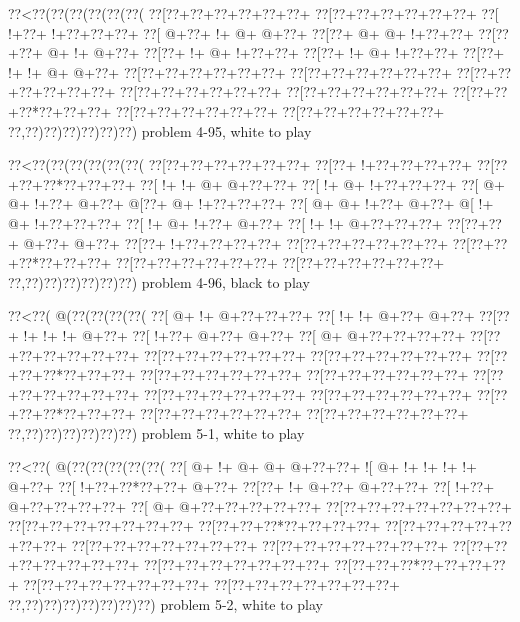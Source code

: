 \vbox{\vbox{\goo
\0??<\0??(\0??(\0??(\0??(\0??(\0??(
\0??[\0??+\0??+\0??+\0??+\0??+\0??+
\0??[\0??+\0??+\0??+\0??+\0??+\0??+
\0??[\- !+\0??+\- !+\0??+\0??+\0??+
\0??[\- @+\0??+\- !+\- @+\- @+\0??+
\0??[\0??+\- @+\- @+\- !+\0??+\0??+
\0??[\0??+\0??+\- @+\- !+\- @+\0??+
\0??[\0??+\- !+\- @+\- !+\0??+\0??+
\0??[\0??+\- !+\- @+\- !+\0??+\0??+
\0??[\0??+\- !+\- !+\- @+\- @+\0??+
\0??[\0??+\0??+\0??+\0??+\0??+\0??+
\0??[\0??+\0??+\0??+\0??+\0??+\0??+
\0??[\0??+\0??+\0??+\0??+\0??+\0??+
\0??[\0??+\0??+\0??+\0??+\0??+\0??+
\0??[\0??+\0??+\0??+\0??+\0??+\0??+
\0??[\0??+\0??+\0??*\0??+\0??+\0??+
\0??[\0??+\0??+\0??+\0??+\0??+\0??+
\0??[\0??+\0??+\0??+\0??+\0??+\0??+
\0??,\0??)\0??)\0??)\0??)\0??)\0??)
}
\hfil problem 4-95, white to play\hfil\break
}

\vbox{\vbox{\goo
\0??<\0??(\0??(\0??(\0??(\0??(\0??(
\0??[\0??+\0??+\0??+\0??+\0??+\0??+
\0??[\0??+\- !+\0??+\0??+\0??+\0??+
\0??[\0??+\0??+\0??*\0??+\0??+\0??+
\0??[\- !+\- !+\- @+\- @+\0??+\0??+
\0??[\- !+\- @+\- !+\0??+\0??+\0??+
\0??[\- @+\- @+\- !+\0??+\- @+\0??+
\- @[\0??+\- @+\- !+\0??+\0??+\0??+
\0??[\- @+\- @+\- !+\0??+\- @+\0??+
\- @[\- !+\- @+\- !+\0??+\0??+\0??+
\0??[\- !+\- @+\- !+\0??+\- @+\0??+
\0??[\- !+\- !+\- @+\0??+\0??+\0??+
\0??[\0??+\0??+\- @+\0??+\- @+\0??+
\0??[\0??+\- !+\0??+\0??+\0??+\0??+
\0??[\0??+\0??+\0??+\0??+\0??+\0??+
\0??[\0??+\0??+\0??*\0??+\0??+\0??+
\0??[\0??+\0??+\0??+\0??+\0??+\0??+
\0??[\0??+\0??+\0??+\0??+\0??+\0??+
\0??,\0??)\0??)\0??)\0??)\0??)\0??)
}
\hfil problem 4-96, black to play\hfil\break
}

\vbox{\vbox{\goo
\0??<\0??(\- @(\0??(\0??(\0??(\0??(
\0??[\- @+\- !+\- @+\0??+\0??+\0??+
\0??[\- !+\- !+\- @+\0??+\- @+\0??+
\0??[\0??+\- !+\- !+\- !+\- @+\0??+
\0??[\- !+\0??+\- @+\0??+\- @+\0??+
\0??[\- @+\- @+\0??+\0??+\0??+\0??+
\0??[\0??+\0??+\0??+\0??+\0??+\0??+
\0??[\0??+\0??+\0??+\0??+\0??+\0??+
\0??[\0??+\0??+\0??+\0??+\0??+\0??+
\0??[\0??+\0??+\0??*\0??+\0??+\0??+
\0??[\0??+\0??+\0??+\0??+\0??+\0??+
\0??[\0??+\0??+\0??+\0??+\0??+\0??+
\0??[\0??+\0??+\0??+\0??+\0??+\0??+
\0??[\0??+\0??+\0??+\0??+\0??+\0??+
\0??[\0??+\0??+\0??+\0??+\0??+\0??+
\0??[\0??+\0??+\0??*\0??+\0??+\0??+
\0??[\0??+\0??+\0??+\0??+\0??+\0??+
\0??[\0??+\0??+\0??+\0??+\0??+\0??+
\0??,\0??)\0??)\0??)\0??)\0??)\0??)
}
\hfil problem 5-1, white to play\hfil\break
}

\vbox{\vbox{\goo
\0??<\0??(\- @(\0??(\0??(\0??(\0??(\0??(
\0??[\- @+\- !+\- @+\- @+\- @+\0??+\0??+
\- ![\- @+\- !+\- !+\- !+\- !+\- @+\0??+
\0??[\- !+\0??+\0??*\0??+\0??+\- @+\0??+
\0??[\0??+\- !+\- @+\0??+\- @+\0??+\0??+
\0??[\- !+\0??+\- @+\0??+\0??+\0??+\0??+
\0??[\- @+\- @+\0??+\0??+\0??+\0??+\0??+
\0??[\0??+\0??+\0??+\0??+\0??+\0??+\0??+
\0??[\0??+\0??+\0??+\0??+\0??+\0??+\0??+
\0??[\0??+\0??+\0??*\0??+\0??+\0??+\0??+
\0??[\0??+\0??+\0??+\0??+\0??+\0??+\0??+
\0??[\0??+\0??+\0??+\0??+\0??+\0??+\0??+
\0??[\0??+\0??+\0??+\0??+\0??+\0??+\0??+
\0??[\0??+\0??+\0??+\0??+\0??+\0??+\0??+
\0??[\0??+\0??+\0??+\0??+\0??+\0??+\0??+
\0??[\0??+\0??+\0??*\0??+\0??+\0??+\0??+
\0??[\0??+\0??+\0??+\0??+\0??+\0??+\0??+
\0??[\0??+\0??+\0??+\0??+\0??+\0??+\0??+
\0??,\0??)\0??)\0??)\0??)\0??)\0??)\0??)
}
\hfil problem 5-2, white to play\hfil\break
}

